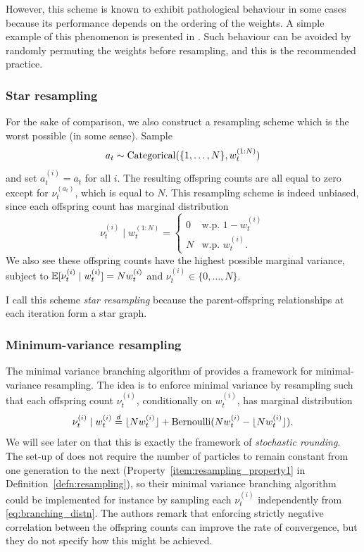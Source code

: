 However, this scheme is known to exhibit pathological behaviour in some cases because its performance depends on the ordering of the weights. A simple example of this phenomenon is presented in \textcite{douc2005}. 
Such behaviour can be avoided by randomly permuting the weights before resampling, and this is the recommended practice. 



\subsubsection{Star resampling \seb{$\checkmark$} }%
For the sake of comparison, we also construct a resampling scheme which is the worst possible (in some sense).
Sample
\begin{equation*}
a_t \sim \operatorname{Categorical}( \{1,\dots, N\}, w_t^{(1:N)} )
\end{equation*}
and set $a_t^{(i)} = a_t$ for all $i$.
The resulting offspring counts are all equal to zero except for $\nu_t^{(a_t)}$, which is equal to $N$.
This resampling scheme is indeed unbiased, since each offspring count has marginal distribution
\begin{equation*}
\nu_t^{(i)}  \mid w_t^{(1:N)} 
= \begin{cases}
0 & \text{w.p. } 1-w_t^{(i)} \\
N & \text{w.p. } w_t^{(i)} .
\end{cases}
\end{equation*}
We also see these offspring counts have the highest possible marginal variance, subject to $\mathbb{E}[ \nu_t^{(i)}  \mid w_t^{(i)} ] = Nw_t^{(i)}$ and $\nu_t^{(i)} \in \{0,\dots,N\}$.

I call this scheme \emph{star resampling} because the parent-offspring relationships at each iteration form a star graph.


\subsubsection{Minimum-variance resampling}

The minimal variance branching algorithm of \textcite{crisan1999} provides a framework for minimal-variance resampling. The idea is to enforce minimal variance by resampling such that each offspring count $\nu_t^{(i)}$, conditionally on $w_t^{(i)}$, has marginal distribution
\begin{equation}\label{eq:branching_distn}
\nu_t^{(i)} \mid w_t^{(i)} \overset{d}{=} \lfloor N w_t^{(i)} \rfloor + \operatorname{Bernoulli}(Nw_t^{(i)} - \lfloor N w_t^{(i)} \rfloor) .
\end{equation}
We will see later on that this is exactly the framework of \emph{stochastic rounding}.
The set-up of \textcite{crisan1999} does not require the number of particles to remain constant from one generation to the next (Property~\ref{item:resampling_property1} in Definition~\ref{defn:resampling}), so their minimal variance branching algorithm could be implemented for instance by sampling each $\nu_t^{(i)}$ independently from \eqref{eq:branching_distn}. The authors remark that enforcing strictly negative correlation between the offspring counts can improve the rate of convergence, but they do not specify how this might be achieved.

